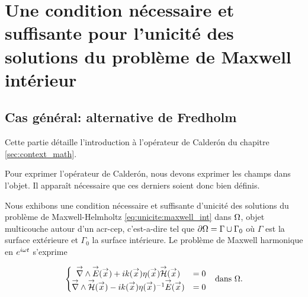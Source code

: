 \section[Une CNS pour l'unicité des solutions du problème de Maxwell intérieur]{Une condition nécessaire et suffisante pour l'unicité des solutions du problème de Maxwell intérieur}
  \subsection{Cas général: alternative de Fredholm}

    Cette partie détaille l'introduction à l'opérateur de Calderón du chapitre \ref{sec:context_math}.


    Pour exprimer l'opérateur de Calderón,
    nous devons exprimer les champs dans l'objet. Il apparaît nécessaire que ces derniers soient donc bien définis.

    Nous exhibons une condition nécessaire et suffisante d'unicité des solutions du problème de Maxwell-Helmholtz  \eqref{eq:unicite:maxwell_int} dans \(\Omega\), objet multicouche autour d'un \gls{acr-cep}, c'est-a-dire tel que \(\partial \Omega = \Gamma \cup \Gamma_0\) où \(\Gamma\) est la surface extérieure et \(\Gamma_0\) la surface intérieure. Le problème de Maxwell harmonique en \(e^{i\omega t}\) s'exprime

    \begin{align}
    \left\lbrace
      \begin{matrix}
        {\overset{\rightarrow}{\nabla}}\wedge {\overset{\rightarrow}{E}}({\overset{\rightarrow}{x}}) + i k({\overset{\rightarrow}{x}})\eta({\overset{\rightarrow}{x}}) {\overset{\rightarrow}{\mathcal{H}}}({\overset{\rightarrow}{x}}) &= 0
        \\
        {\overset{\rightarrow}{\nabla}}\wedge {\overset{\rightarrow}{\mathcal{H}}}({\overset{\rightarrow}{x}}) - i k({\overset{\rightarrow}{x}})\eta({\overset{\rightarrow}{x}})^{-1} {\overset{\rightarrow}{E}}({\overset{\rightarrow}{x}}) &= 0
      \end{matrix}
      \right. && \text{dans \(\Omega\).}
      \label{eq:unicite:maxwell_int}
    \end{align}

